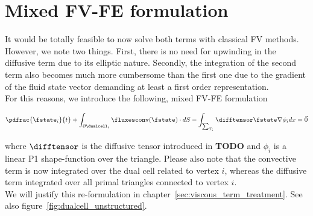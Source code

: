 \documentclass[../main.tex]{subfiles}
\begin{document}
\section{Mixed \ac{FV}-\ac{FE} formulation}\label{sec:mixed_FV_FE_formulation}
It would be totally feasible to now solve both terms with classical \ac{FV} methods. However, we note two things. First, there is no need for upwinding in the diffusive term due to its elliptic nature.
Secondly, the integration of the second term also becomes much more cumbersome than the first one due to the gradient of the fluid state vector demanding at least a first order representation.\\
For this reasons, we introduce the following, mixed \ac{FV}-\ac{FE} formulation

\begin{align}\label{eq_mixed_FV_FE}
\pdfrac{\fstate_i}{t} +
\int_{\partial\dualcell_i} \fluxesconv(\fstate)\cdot dS -
\int_{\sum_{T_i}} \difftensor \fstate \nabla \phi_i dx =
\vec{0}
\end{align}

where $\difftensor$ is the diffusive tensor introduced in \textbf{TODO} and $\phi_i$ is a linear P1 shape-function over the triangle.
Please also note that the convective term is now integrated over the dual cell related to vertex $i$, whereas the diffusive term integrated over all primal triangles connected to vertex $i$.\\
We will justify this re-formulation in chapter~\ref{sec:viscous_term_treatment}. See also figure~\ref{fig:dualcell_unstructured}.
\end{document}
